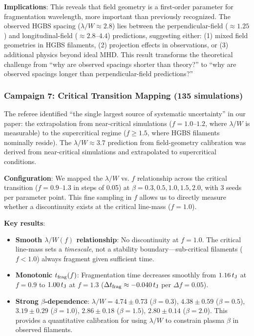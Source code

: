\documentclass[twoside,twocolumn]{mnras}
\begin{document}
\textbf{Implications}: This reveals that field geometry is a first-order parameter for fragmentation wavelength, more important than previously recognized. The observed HGBS spacing ($\lambda/W \approx 2.8$) lies between the perpendicular-field ($\approx 1.25$) and longitudinal-field ($\approx 2.8$--$4.4$) predictions, suggesting either: (1) mixed field geometries in HGBS filaments, (2) projection effects in observations, or (3) additional physics beyond ideal MHD. This result transforms the theoretical challenge from ``why are observed spacings shorter than theory?'' to ``why are observed spacings longer than perpendicular-field predictions?''

\subsubsection{Campaign 7: Critical Transition Mapping (135 simulations)}

The referee identified ``the single largest source of systematic uncertainty'' in our paper: the extrapolation from near-critical simulations ($f = 1.0$--$1.2$, where $\lambda/W$ is measurable) to the supercritical regime ($f \geq 1.5$, where HGBS filaments nominally reside). The $\lambda/W \approx 3.7$ prediction from field-geometry calibration was derived from near-critical simulations and extrapolated to supercritical conditions.

\textbf{Configuration}: We mapped the $\lambda/W$ vs. $f$ relationship across the critical transition ($f = 0.9$--$1.3$ in steps of 0.05) at $\beta = 0.3, 0.5, 1.0, 1.5, 2.0$, with 3 seeds per parameter point. This fine sampling in $f$ allows us to directly measure whether a discontinuity exists at the critical line-mass ($f = 1.0$).

\textbf{Key results}:
\begin{itemize}
    \item \textbf{Smooth $\lambda/W(f)$ relationship}: No discontinuity at $f = 1.0$. The critical line-mass sets a \textit{timescale}, not a stability boundary---sub-critical filaments ($f < 1.0$) always fragment given sufficient time.
    \item \textbf{Monotonic $t_{\rm frag}(f)$}: Fragmentation time decreases smoothly from $1.16\,t_{\rm J}$ at $f = 0.9$ to $1.00\,t_{\rm J}$ at $f = 1.3$ ($\Delta t_{\rm frag} \approx -0.040\,t_{\rm J}$ per $\Delta f = 0.05$).
    \item \textbf{Strong $\beta$-dependence}: $\lambda/W = 4.74 \pm 0.73$ ($\beta = 0.3$), $4.38 \pm 0.59$ ($\beta = 0.5$), $3.19 \pm 0.29$ ($\beta = 1.0$), $2.86 \pm 0.18$ ($\beta = 1.5$), $2.80 \pm 0.14$ ($\beta = 2.0$). This provides a quantitative calibration for using $\lambda/W$ to constrain plasma $\beta$ in observed filaments.
\end{itemize}
\end{document}
